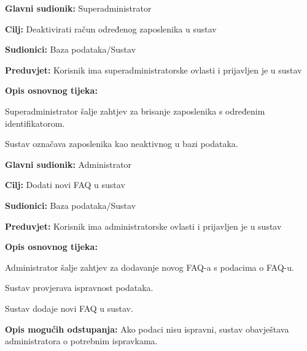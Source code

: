 \noindent {}
\begin{packed_item}
	
	\item \textbf{Glavni sudionik: }Superadministrator
	\item  \textbf{Cilj:} Deaktivirati račun određenog zaposlenika u sustav
	\item  \textbf{Sudionici:} Baza podataka/Sustav
	\item  \textbf{Preduvjet:} Korisnik ima superadministratorske ovlasti i prijavljen je u sustav
	\item  \textbf{Opis osnovnog tijeka:}
	
	\item[] \begin{packed_enum}
		
		\item Superadministrator šalje zahtjev za brisanje zaposlenika s određenim identifikatorom.
		\item Sustav označava zaposlenika kao neaktivnog u bazi podataka.
		
	\end{packed_enum}
	
	
\end{packed_item}

\noindent {}
\begin{packed_item}
	
	\item \textbf{Glavni sudionik: }Administrator
	\item  \textbf{Cilj:} Dodati novi FAQ u sustav
	\item  \textbf{Sudionici:} Baza podataka/Sustav
	\item  \textbf{Preduvjet:} Korisnik ima administratorske ovlasti i prijavljen je u sustav
	\item  \textbf{Opis osnovnog tijeka:}
	
	\item[] \begin{packed_enum}
		
		\item Administrator šalje zahtjev za dodavanje novog FAQ-a s podacima o FAQ-u.
		\item Sustav provjerava ispravnost podataka.
		\item Sustav dodaje novi FAQ u sustav.
		
	\end{packed_enum}
	
	\item  \textbf{Opis mogućih odstupanja:} Ako podaci nisu ispravni, sustav obavještava administratora o potrebnim ispravkama.
	
	
\end{packed_item}

